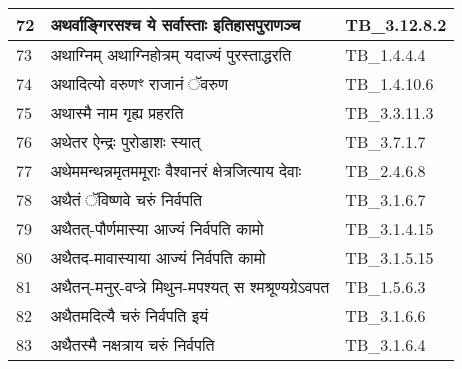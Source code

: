 \documentclass[17pt]{extarticle}
\begin{document}
\begin{longtable}{||p{0.4in}||p{4.9in}||p{0.9in}||}
    \hline
        
    72 & अथर्वाङ्गिरसश्च ये सर्वास्ताः इतिहासपुराणञ्च & TB\_3.12.8.2       \\
    
    \hline
        
    73 & अथाग्निम् अथाग्निहोत्रम् यदाज्यं पुरस्ताद्धरति & TB\_1.4.4.4       \\
    
    \hline
        
    74 & अथादित्यो वरुणꣳ राजानं ॅवरुण & TB\_1.4.10.6       \\
    
    \hline
        
    75 & अथास्मै नाम गृह्य प्रहरति & TB\_3.3.11.3       \\
    
    \hline
        
    76 & अथेतर ऐन्द्रः पुरोडाशः स्यात् & TB\_3.7.1.7       \\
    
    \hline
        
    77 & अथेममन्थन्नमृतममूराः वैश्वानरं क्षेत्रजित्याय देवाः & TB\_2.4.6.8       \\
    
    \hline
        
    78 & अथैतं ॅविष्णवे चरुं निर्वपति & TB\_3.1.6.7       \\
    
    \hline
        
    79 & अथैतत्{-}पौर्णमास्या आज्यं निर्वपति कामो & TB\_3.1.4.15       \\
    
    \hline
        
    80 & अथैतद{-}मावास्याया आज्यं निर्वपति कामो & TB\_3.1.5.15       \\
    
    \hline
        
    81 & अथैतन्{-}मनुर्{-}वप्त्रे मिथुन{-}मपश्यत् स श्मश्रूण्यग्रेऽवपत & TB\_1.5.6.3       \\
    
    \hline
        
    82 & अथैतमदित्यै चरुं निर्वपति इयं & TB\_3.1.6.6       \\
    
    \hline
        
    83 & अथैतस्मै नक्षत्राय चरुं निर्वपति & TB\_3.1.6.4       \\
    
    \hline
        

\end{longtable}
\end{document}
